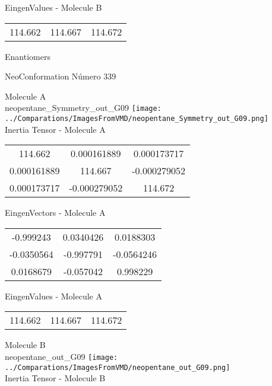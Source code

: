\begin{multicols}{2}
\begin{center}
\vtab
 EingenValues - Molecule B     \\
\vtab
\begin{tabular}{|c c c|}
114.662	 & 	114.667	 & 	114.672	 \\
\end{tabular}

\end{center}
\end{multicols}
\begin{center}
\vtab
\vtab
\textcolor{NavyBlue}{\Large Enantiomers}
\end{center}

 \newpage

\vtab[-2cm]
\begin{center}
{\large NeoConformation \tab Número 339}
\end{center}
\begin{multicols}{2}
\begin{center}

Molecule A \\ 
neopentane\_Symmetry\_out\_G09
\texttt{[image: ../Comparations/ImagesFromVMD/neopentane\_Symmetry\_out\_G09.png]}
\\
Inertia Tensor - Molecule A \\
\vtab

\begin{tabular}{|c c c|}
114.662	 & 	0.000161889	 & 	0.000173717	 \\
0.000161889	 & 	114.667	 & 	-0.000279052	 \\
0.000173717	 & 	-0.000279052	 & 	114.672
\end{tabular}

\vtab
 EingenVectors - Molecule A     \\
\vtab
\begin{tabular}{|c c c|}
-0.999243	 & 	0.0340426	 & 	0.0188303	 \\
-0.0350564	 & 	-0.997791	 & 	-0.0564246	 \\
0.0168679	 & 	-0.057042	 & 	0.998229
\end{tabular}

\vtab
 EingenValues - Molecule A     \\
\vtab
\begin{tabular}{|c c c|}
114.662	 & 	114.667	 & 	114.672	 \\
\end{tabular}
\columnbreak

Molecule B \\ 
neopentane\_out\_G09
\texttt{[image: ../Comparations/ImagesFromVMD/neopentane\_out\_G09.png]}
\\
Inertia Tensor - Molecule B \\
\vtab


\end{center}
\end{multicols}
